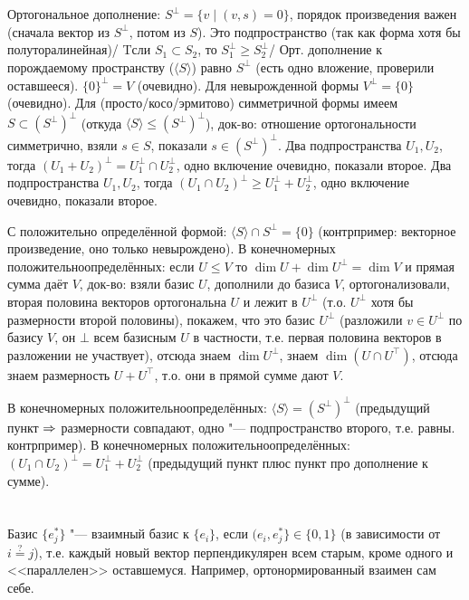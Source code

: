 \section{} %
Ортогональное дополнение: $S^\bot = \{ v \mid (v, s) = 0 \}$, порядок произведения важен (сначала вектор из $S^\bot$, потом из $S$).
Это подпространство (так как форма хотя бы полуторалинейная)/
Tсли $S_1 \subset S_2$, то $S_1^\bot \ge S_2^\bot$/
Орт. дополнение к порождаемому пространству ($\langle S \rangle$) равно $S^\bot$ (есть одно вложение, проверили оставшееся).
$\{0\}^\bot=V$ (очевидно).
Для невырожденной формы $V^\bot = \{0\}$ (очевидно).
Для (просто/косо/эрмитово) симметричной формы имеем $S \subset (S^\bot)^\bot$ (откуда $\langle S \rangle \le (S^\bot)^\bot$),
док-во: отношение ортогональности симметрично, взяли $s \in S$, показали $s \in (S^\bot)^\bot$.
Два подпространства $U_1, U_2$, тогда $(U_1+U_2)^\bot = U_1^\bot \cap U_2^\bot$, одно включение очевидно, показали второе.
Два подпространства $U_1, U_2$, тогда $(U_1\cap U_2)^\bot \ge U_1^\bot + U_2^\bot$, одно включение очевидно, показали второе.

С положительно определённой формой: $\langle S \rangle \cap S^\bot = \{0\}$ (контрпример: векторное произведение, оно только невырождено).
В конечномерных положительноопределённых: если $U \le V$ то $\dim U + \dim U^\bot = \dim V$ и прямая сумма даёт $V$,
док-во: взяли базис $U$, дополнили до базиса $V$, ортогонализовали, вторая половина векторов ортогональна $U$ и лежит в $U^\bot$
(т.о. $U^\bot$ хотя бы размерности второй половины), покажем, что это базис $U^\bot$ (разложили $v\in U^\bot$ по базису $V$, он $\bot$ всем базисным
$U$ в частности, т.е. первая половина векторов в разложении не участвует), отсюда знаем $\dim U^\bot$, знаем $\dim (U\cap U^\top)$, отсюда
знаем размерность $U+U^\top$, т.о. они в прямой сумме дают $V$.

В конечномерных положительноопределённых: $\langle S \rangle = (S^\bot)^\bot$
(предыдущий пункт $\Rightarrow$ размерности совпадают, одно "--- подпространство второго, т.е. равны. \TODO контрпример).
В конечномерных положительноопределённых: $(U_1\cap U_2)^\bot = U_1^\bot + U_2^\bot$ (предыдущий пункт плюс пункт про дополнение к сумме).

\section{} %
Базис $\{e_j^*\}$ "--- взаимный базис к $\{e_i\}$, если $(e_i, e_j^*\} \in \{0, 1\}$ (в зависимости от $i\stackrel{?}{=}j$),
т.е. каждый новый вектор перпендикулярен всем старым, кроме одного и <<параллелен>> оставшемуся.
Например, ортонормированный взаимен сам себе.

